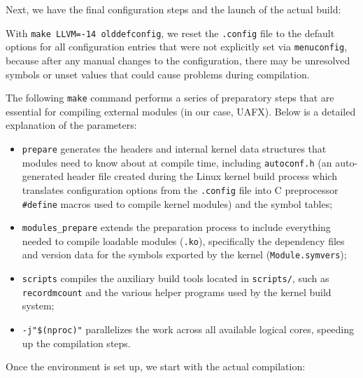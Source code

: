 \noindent Next, we have the final configuration steps and the launch of the actual build:

\begin{listing}[H]
\end{listing}

\noindent With \texttt{make LLVM=-14 olddefconfig}, we reset the \texttt{.config} file to the default options for all configuration entries that were not explicitly set via \texttt{menuconfig}, because after any manual changes to the configuration, there may be unresolved symbols or unset values that could cause problems during compilation.

The following \texttt{make} command performs a series of preparatory steps that are essential for compiling external modules (in our case, UAFX). Below is a detailed explanation of the parameters:
\begin{itemize}
    \item \texttt{prepare} generates the headers and internal kernel data structures that modules need to know about at compile time, including \texttt{autoconf.h} (an auto-generated header file created during the Linux kernel build process which translates configuration options from the \texttt{.config} file into C preprocessor \texttt{\#define} macros used to compile kernel modules) and the symbol tables;

    \item \texttt{modules\_prepare} extends the preparation process to include everything needed to compile loadable modules (\texttt{.ko}), specifically the dependency files and version data for the symbols exported by the kernel (\texttt{Module.symvers});

    \item \texttt{scripts} compiles the auxiliary build tools located in \texttt{scripts/}, such as \texttt{recordmcount} and the various helper programs used by the kernel build system;

    \item \texttt{-j"\$(nproc)"} parallelizes the work across all available logical cores, speeding up the compilation steps.
\end{itemize}

\noindent Once the environment is set up, we start with the actual compilation:


